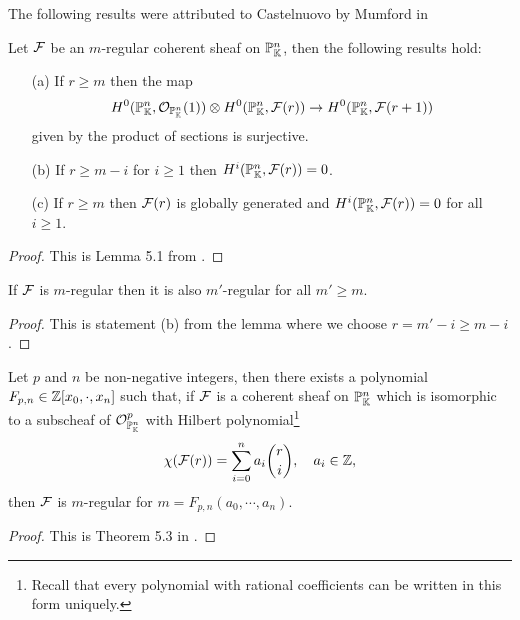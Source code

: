 The following results were attributed to Castelnuovo by Mumford in \cite{mumford1966lectures}
\begin{lemma}[Castelnuovo]\label{CastelnuovoLemma}
Let $\mathcal{F}$ be an $m$-regular coherent sheaf on $\mathbb{P}^n_{\mathbb{K}}$, then the following results hold:
\begin{enumerate}
\item[\rm(a)] If $r\geq m$ then the map
\[H^0(\mathbb{P}^n_{\mathbb{K}},\mathcal{O}_{\mathbb{P}^n_{\mathbb{K}}}(1))\otimes H^0(\mathbb{P}^n_{\mathbb{K}},\mathcal{F}(r))\to H^0(\mathbb{P}^n_{\mathbb{K}},\mathcal{F}(r+1))\]
given by the product of sections is surjective.
\item[\rm(b)] If $r\geq m-i$ for $i\geq 1$ then $H^i(\mathbb{P}^n_{\mathbb{K}},\mathcal{F}(r))=0$.
\item[\rm(c)] If $r\geq m$ then $\mathcal{F}(r)$ is globally generated and $H^i(\mathbb{P}^n_{\mathbb{K}},\mathcal{F}(r))=0$ for all $i\geq 1$.
\end{enumerate}
\end{lemma}
\begin{proof}
This is Lemma 5.1 from \cite{FGAEXPLAINED}.
\end{proof}

\begin{corollary}\label{RegularityUnboundedAbove}
If $\mathcal{F}$ is $m$-regular then it is also $m'$-regular for all $m'\geq m$.
\end{corollary}
\begin{proof}
This is statement (b) from the lemma where we choose $r=m'-i\geq m-i$.
\end{proof}

\begin{theorem}[Mumford]\label{MumfordTheorem}
Let $p$ and $n$ be non-negative integers, then there exists a polynomial $F_{p,n}\in\mathbb{Z}[x_0,\cdot, x_n]$ such that, if $\mathcal{F}$ is a coherent sheaf on $\mathbb{P}^n_{\mathbb{K}}$ which is isomorphic to a subscheaf of $\mathcal{O}^p_{\mathbb{P}^n_{\mathbb{K}}}$ with Hilbert polynomial\footnote{Recall that every polynomial with rational coefficients can be written in this form uniquely.}
\[\chi(\mathcal{F}(r))=\sum_{i=0}^na_i\binom ri,\quad a_i\in\mathbb{Z},\]
then $\mathcal{F}$ is $m$-regular for $m=F_{p,n}(a_0,\cdots, a_n)$.
\end{theorem}
\begin{proof}
This is Theorem 5.3 in \cite{FGAEXPLAINED}.
\end{proof}

